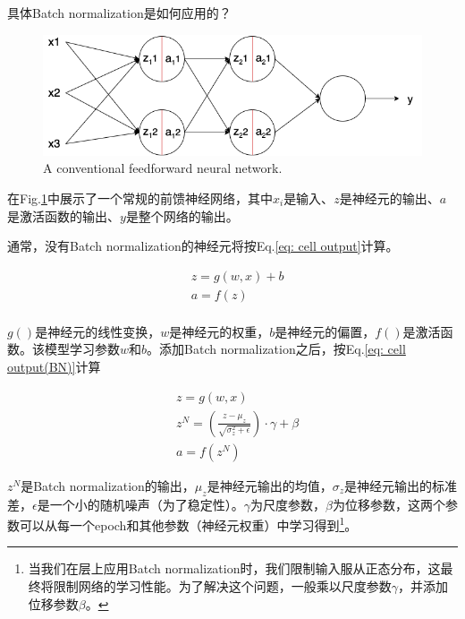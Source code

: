 \documentclass[letterpaper,10pt]{article}
\begin{document}
	具体Batch normalization是如何应用的？
	
	\begin{figure}[htbp]
		\centering 
		\includegraphics[width=0.8\columnwidth]{picture/neural-network}
		\captionsetup{font=scriptsize}
		\caption{
			\label{fig: Neural Network} 
			A conventional feedforward neural network.
		}
	\end{figure}
	
	在Fig.\ref{fig: Neural Network}中展示了一个常规的前馈神经网络，其中$x_i$是输入、$z$是神经元的输出、$a$是激活函数的输出、$y$是整个网络的输出。
	
	通常，没有Batch normalization的神经元将按Eq.\ref{eq: cell output}计算。
	
	\begin{equation}
		\begin{aligned}
			& z = g \left( w,x \right) + b \\
			& a = f(z) \\
		\end{aligned}
		\label{eq: cell output}
	\end{equation}
	
	$g()$是神经元的线性变换，$w$是神经元的权重，$b$是神经元的偏置，$f()$是激活函数。该模型学习参数$w$和$b$。添加Batch normalization之后，按Eq.\ref{eq: cell output(BN)}计算
	
	\begin{equation}
		\begin{aligned}
			& z = g \left( w,x \right)\\
			& z^N = \left(\frac{z-\mu_z}{\sqrt{\sigma_z^2 + \epsilon}}\right) \cdot \gamma + \beta \\
			& a = f(z^N) 
		\end{aligned}
		\label{eq: cell output(BN)}
	\end{equation}
	
	$z^N$是Batch normalization的输出，$\mu_z$是神经元输出的均值，$\sigma_z$是神经元输出的标准差，$\epsilon$是一个小的随机噪声（为了稳定性）。$\gamma$为尺度参数，$\beta$为位移参数，这两个参数可以从每一个epoch和其他参数（神经元权重）中学习得到\footnote{当我们在层上应用Batch normalization时，我们限制输入服从正态分布，这最终将限制网络的学习性能。为了解决这个问题，一般乘以尺度参数$\gamma$，并添加位移参数$\beta$。}。
	
\end{document}
